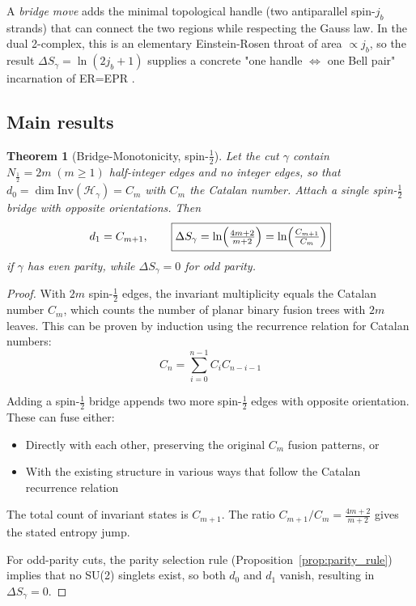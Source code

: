 \documentclass[11pt, a4paper]{article}
\theoremstyle{plain}
\newtheorem{theorem}{Theorem}[section]
\theoremstyle{definition}
\theoremstyle{remark}
\newcommand{\Hil}{\mathcal{H}}
\newcommand{\Inv}{\mathrm{Inv}}
\begin{document}
A \emph{bridge move} adds the minimal topological handle (two antiparallel spin-$j_b$ strands) that can connect the two regions while respecting the Gauss law. In the dual 2-complex, this is an elementary Einstein-Rosen throat of area $\propto j_b$, so the result $\Delta S_{\gamma}=\ln(2j_b+1)$ supplies a concrete "one handle $\Leftrightarrow$ one Bell pair" incarnation of ER=EPR \cite{MaldacenaSusskind2013}.

\subsection{Main results}

\begin{theorem}[Bridge-Monotonicity, spin-$\tfrac12$]
  \label{thm:main}
  Let the cut $\gamma$ contain $N_{\tfrac12}=2m\;(m\!\ge\!1)$ half-integer edges and no integer edges, so that
  \(
    d_0=\dim\Inv(\Hil_{\gamma})=C_m
  \)
  with $C_m$ the Catalan number.
  Attach a single spin-$\tfrac12$ bridge with opposite orientations.
  Then
  \[  d_1 = C_{m+1},\qquad  \boxed{    \Delta S_{\gamma}      =\ln\Bigl(\tfrac{4m+2}{m+2}\Bigr)      =\ln\Bigl(\tfrac{C_{m+1}}{C_m}\Bigr)}\]
  if $\gamma$ has even parity, while $\Delta S_{\gamma}=0$ for odd parity.
\end{theorem}

\begin{proof}
  With $2m$ spin-$\frac{1}{2}$ edges, the invariant multiplicity equals the Catalan number $C_m$, which counts the number of planar binary fusion trees with $2m$ leaves. This can be proven by induction using the recurrence relation for Catalan numbers:
  \begin{equation}
    C_n = \sum_{i=0}^{n-1} C_i C_{n-i-1}
  \end{equation}

  Adding a spin-$\frac{1}{2}$ bridge appends two more spin-$\frac{1}{2}$ edges with opposite orientation. These can fuse either:
  \begin{itemize}
    \item Directly with each other, preserving the original $C_m$ fusion patterns, or
    \item With the existing structure in various ways that follow the Catalan recurrence relation
  \end{itemize}

  The total count of invariant states is $C_{m+1}$. The ratio $C_{m+1}/C_m = \frac{4m+2}{m+2}$ gives the stated entropy jump.

  For odd-parity cuts, the parity selection rule (Proposition~\ref{prop:parity_rule}) implies that no SU(2) singlets exist, so both $d_0$ and $d_1$ vanish, resulting in $\Delta S_{\gamma} = 0$.
\end{proof}
\end{document}
